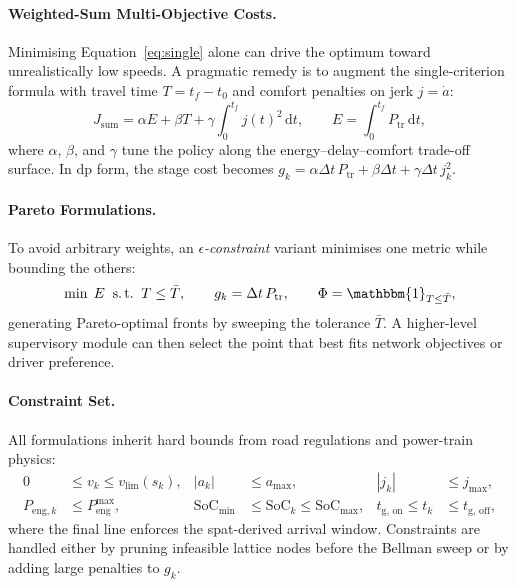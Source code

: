 \paragraph{Weighted-Sum Multi-Objective Costs.}
Minimising Equation~\eqref{eq:single} alone can drive the optimum toward unrealistically low speeds. A pragmatic remedy is to augment the single-criterion formula with travel time $T = t_f - t_0$ and comfort penalties on jerk $j = \dot a$:
\begin{equation*}
    J_{\mathrm{sum}} = \alpha E + \beta T + \gamma \int_{0}^{t_f} j(t)^2\,\mathrm{d}t,
    \qquad
    E = \int_{0}^{t_f} P_{\text{tr}}\,\mathrm{d}t,
\label{eq:weighted}
\end{equation*}
where $\alpha$, $\beta$, and $\gamma$ tune the policy along the energy–delay–comfort trade-off surface. In \ac{dp} form, the stage cost becomes
$g_k = \alpha \Delta t\,P_{\text{tr}} + \beta \Delta t + \gamma \Delta t\,j_k^2$.

\paragraph{Pareto Formulations.}
To avoid arbitrary weights, an \emph{$\epsilon$-constraint} variant minimises one metric while bounding the others:
\begin{equation*}
    \min\;E \;\;\text{s.\,t.}\;\;T \le \bar T, \qquad
    g_k = \Delta t\,P_{\text{tr}}, \qquad
    \Phi = \mathbbm{1}_{T \le \bar T},
\end{equation*}
generating Pareto-optimal fronts by sweeping the tolerance $\bar T$. A higher-level supervisory module can then select the point that best fits network objectives or driver preference.

\paragraph{Constraint Set.}
All formulations inherit hard bounds from road regulations and power-train physics:
\begin{align*}
    0 &\le v_k\le v_{\mathrm{lim}}(s_k), &
    |a_k| &\le a_{\max}, &
    |j_k| &\le j_{\max}, \nonumber\\
    P_{\text{eng},k} &\le P_{\text{eng}}^{\max}, &
    \mathrm{SoC}_{\min} &\le \mathrm{SoC}_k\le \mathrm{SoC}_{\max}, &
    t_{\mathrm{g,\,on}}\le t_k &\le t_{\mathrm{g,\,off}},
\end{align*}
where the final line enforces the \ac{spat}-derived arrival window. Constraints are handled either by pruning infeasible lattice nodes before the Bellman sweep or by adding large penalties to $g_k$.

